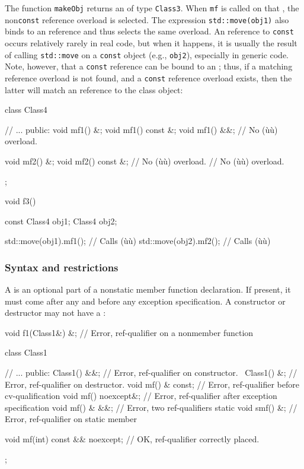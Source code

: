 The function \lstinline!makeObj! returns an  of type
\lstinline!Class3!. When \lstinline!mf! is called on that , the
non\lstinline!const!  reference overload is selected. The
expression \lstinline!std::move(obj1)! also binds to an 
reference and thus selects the same overload. An  reference
to \lstinline!const! occurs relatively rarely in real code, but when it
happens, it is usually the result of calling \lstinline!std::move! on a
\lstinline!const! object (e.g., \lstinline!obj2!), especially in generic code.
Note, however, that a \lstinline!const!  reference can be
bound to an ; thus, if a matching  reference
overload is not found, and a \lstinline!const!  reference
overload exists, then the latter will match an  reference
to the class object:

\begin{emcppslisting}
class Class4
{
    // ...
public:
    void mf1() &;
    void mf1() const &;
    void mf1() &&;
    // No (ù{}ù) overload.

    void mf2() &;
    void mf2() const &;
    // No (ù{}ù) overload.
    // No (ù{}ù) overload.
};

void f3()
{
    const Class4 obj1;
    Class4       obj2;

    std::move(obj1).mf1();  // Calls (ù{}ù)
    std::move(obj2).mf2();  // Calls (ù{}ù)
}
\end{emcppslisting}
    

\subsubsection[Syntax and restrictions]{Syntax and restrictions}\label{syntax-and-restrictions}

A  is an optional part of a nonstatic member
function declaration. If present, it must come after any
 and before any exception specification. A
constructor or destructor may not have a :

\begin{emcppslisting}
void f1(Class1&) &;  // Error, ref-qualifier on a nonmember function

class Class1
{
    // ...
public:
    Class1() &&;          // Error, ref-qualifier on constructor.
    ~Class1() &;          // Error, ref-qualifier on destructor.
    void mf() & const;    // Error, ref-qualifier before cv-qualification
    void mf() noexcept&;  // Error, ref-qualifier after exception specification
    void mf() & &&;       // Error, two ref-qualifiers
    static void smf() &;  // Error, ref-qualifier on static member

    void mf(int) const && noexcept;  // OK, ref-qualifier correctly placed.
};
\end{emcppslisting}
    

